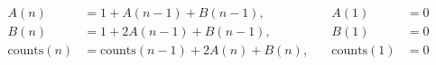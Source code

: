 \documentclass{article}
\begin{document}
\begin{align*}
A(n) &= 1 + A(n-1) + B(n-1), \quad &A(1) &= 0 \\
B(n) &= 1 + 2A(n-1) + B(n-1), \quad &B(1) &= 0 \\
\text{counts}(n) &= \text{counts}(n-1) + 2A(n) + B(n), \quad &\text{counts}(1) &= 0
\end{align*}
\end{document}
